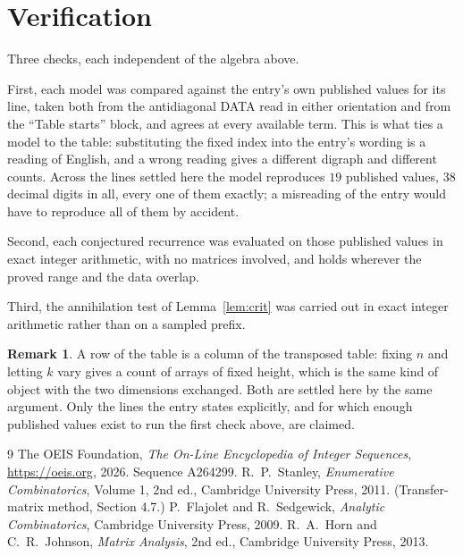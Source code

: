 \documentclass[11pt,a4paper]{article}
\theoremstyle{plain}
\theoremstyle{definition}
\newtheorem{remark}[theorem]{Remark}
\begin{document}
\section{Verification}

Three checks, each independent of the algebra above.

First, each model was compared against the entry's own published values for its line, taken
both from the antidiagonal DATA read in either orientation and from the ``Table starts''
block, and agrees at every available term. This is what ties a model to the table:
substituting the fixed index into the entry's wording is a reading of English, and a wrong
reading gives a different digraph and different counts. Across the lines settled here the
model reproduces $19$ published values, $38$ decimal digits in all, every one of
them exactly; a misreading of the entry would have to reproduce all of them by accident.

Second, each conjectured recurrence was evaluated on those published values in exact
integer arithmetic, with no matrices involved, and holds wherever the proved range and the
data overlap.

Third, the annihilation test of Lemma~\ref{lem:crit} was carried out in exact integer
arithmetic rather than on a sampled prefix.

\begin{remark}
A row of the table is a column of the transposed table: fixing $n$ and letting $k$ vary gives a
count of arrays of fixed height, which is the same kind of object with the two dimensions
exchanged. Both are settled here by the same argument. Only the lines the entry states
explicitly, and for which enough published values exist to run the first check above, are
claimed.
\end{remark}

\begin{thebibliography}{9}
 The OEIS Foundation, \emph{The On-Line Encyclopedia of Integer
Sequences}, \url{https://oeis.org}, 2026. Sequence A264299.
 R.~P.~Stanley, \emph{Enumerative Combinatorics}, Volume 1, 2nd ed.,
Cambridge University Press, 2011. (Transfer-matrix method, Section 4.7.)
 P.~Flajolet and R.~Sedgewick, \emph{Analytic Combinatorics}, Cambridge
University Press, 2009.
 R.~A.~Horn and C.~R.~Johnson, \emph{Matrix Analysis}, 2nd ed., Cambridge
University Press, 2013.
\end{thebibliography}
\end{document}
